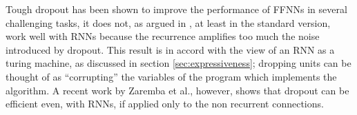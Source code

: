 Tough dropout has been shown \cite{dropout} to improve the performance of FFNNs in several challenging tasks, it does not, as argued in \cite{dropoutBayer}, at least in the standard version, work well with RNNs because the recurrence amplifies too much the noise introduced by dropout. This result is in accord with the view of an RNN as a turing machine, as discussed in section \ref{sec:expressiveness}; dropping units can be thought of as ``corrupting'' the variables of the program which implements the algorithm.
A recent work by Zaremba et al., however, shows that dropout can be efficient even, with RNNs, if applied only to the non recurrent connections\cite{dropoutRNNs}.
